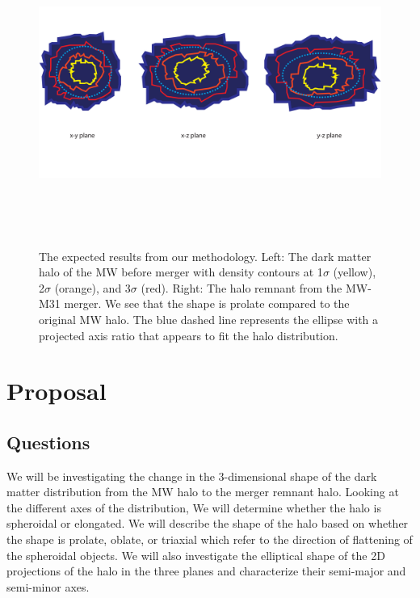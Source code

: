 \documentclass[linenumbers, twocolumn]{aastex631}
\begin{document}
\begin{figure}
    \centering
    \includegraphics[width=\textwidth,height=10cm]{ASTR400B_proposal_diagram_2.pdf}
    \caption{The expected results from our methodology. Left: The dark matter halo of the MW before merger with density contours at 1$\sigma$ (yellow), 2$\sigma$ (orange), and 3$\sigma$ (red). Right: The halo remnant from the MW-M31 merger. We see that the shape is prolate compared to the original MW halo. The blue dashed line represents the ellipse with a projected axis ratio that appears to fit the halo distribution.}
    \label{fig:method_fig}
\end{figure}

\section{Proposal} \label{sec:proposal}



\subsection{Questions} \label{sec:questions}
We will be investigating the change in the 3-dimensional shape of the dark matter distribution from the MW halo to the merger remnant halo. 
Looking at the different axes of the distribution, We will determine whether the halo is spheroidal or elongated. 
We will describe the shape of the halo based on whether the shape is prolate, oblate, or triaxial which refer to the direction of flattening of the spheroidal objects.
We will also investigate the elliptical shape of the 2D projections of the halo in the three planes and characterize their semi-major and semi-minor axes.
\end{document}

